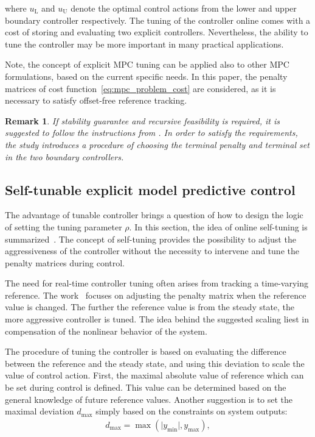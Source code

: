 \documentclass[preprint,12pt]{elsarticle}
\newtheorem{remark}[theorem]{Remark}
\begin{document}
where $u_\mathrm{L}$ and $u_\mathrm{U}$ denote the optimal control actions from the lower and upper boundary controller respectively. The tuning of the controller online comes with a cost of storing and evaluating two explicit controllers. Nevertheless, the ability to tune the controller may be more important in many practical applications.

Note, the concept of explicit MPC tuning can be applied also to other MPC formulations, based on the current specific needs. In this paper, the penalty matrices of cost function~\eqref{eq:mpc_problem_cost} are considered, as it is necessary to satisfy offset-free reference tracking.

\begin{remark}
	If stability guarantee and recursive feasibility is required, it is suggested to follow the instructions from \cite{Oravec_tunable}. In order to satisfy the requirements, the study introduces a procedure of choosing the terminal penalty and terminal set in the two boundary controllers. 
\end{remark}

\subsection{Self-tunable explicit model predictive control}
\label{sec:self_tunable}
The advantage of tunable controller brings a question of how to design the logic of setting the tuning parameter $\rho$. In this section, the idea of online self-tuning is summarized~\cite{self_tunable}. The concept of self-tuning provides the possibility to adjust the aggressiveness of the controller without the necessity to intervene and tune the penalty matrices during control. 

The need for real-time controller tuning often arises from tracking a time-varying reference. The work~\cite{self_tunable} focuses on adjusting the penalty matrix when the reference value is changed. The further the reference value is from the steady state, the more aggressive controller is tuned. The idea behind the suggested scaling liest in compensation of the nonlinear behavior of the system.  

The procedure of tuning the controller is based on evaluating the difference between the reference and the steady state, and using this deviation to scale the value of control action. First, the maximal absolute value of reference which can be set during control is defined. This value can be determined based on the general knowledge of future reference values. Another suggestion is to set the maximal deviation $d_{\max}$ simply based on the constraints on system outputs: 
\begin{eqnarray}
	\label{eq:d_max}
	d_{\max} = \max(\vert y_{\min} \vert, y_{\max}),
\end{eqnarray}
\end{document}
